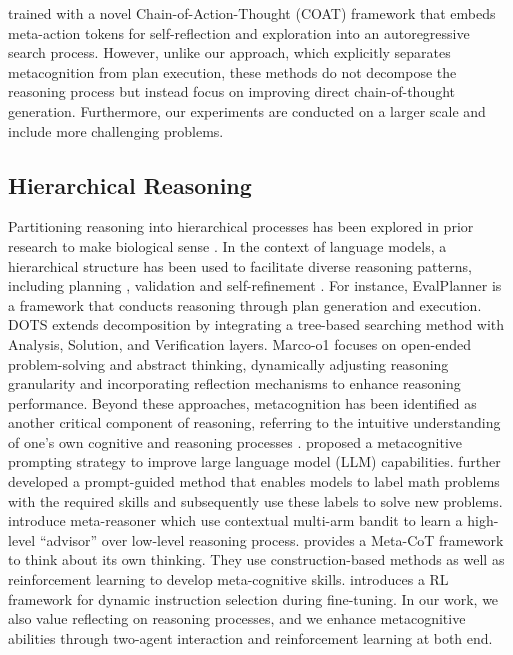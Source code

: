 \citet{shen2025satorireinforcementlearningchainofactionthought} trained with a novel Chain-of-Action-Thought (COAT) framework that embeds meta-action tokens for self-reflection and exploration into an autoregressive search process.
However, unlike our approach, which explicitly separates metacognition from plan execution, these methods do not decompose the reasoning process but instead focus on improving direct chain-of-thought generation. Furthermore, our experiments are conducted on a larger scale and include more challenging problems.

\subsection{Hierarchical Reasoning}\label{sec:ref3}
\label{related_work:hrl_reason}
Partitioning reasoning into hierarchical processes has been explored in prior research to make biological sense \citep{ye2018survey,langley2004hierarchical}. In the context of language models, a hierarchical structure has been used to facilitate diverse reasoning patterns, including planning \citep{puerta2025roadmap,sun2024retrieval,song2023llm,rana2023sayplan,chen2024autotamp,yan2023ask,xiao2024cellagent}, validation \citep{haji2024improvingllmreasoningmultiagent,xi2024enhancing} and self-refinement \citep{madaan2023self,kumar2024training,welleck2022generating}. For instance, EvalPlanner \citep{saha2025learningplanreason} is a framework that conducts reasoning through plan generation and execution. DOTS \citep{DBLP:journals/corr/abs-2410-03864} extends decomposition by integrating a tree-based searching method with Analysis, Solution, and Verification layers. Marco-o1 \citep{zhao2024marcoo1openreasoningmodels} focuses on open-ended problem-solving and abstract thinking, dynamically adjusting reasoning granularity and incorporating reflection mechanisms to enhance reasoning performance. Beyond these approaches, metacognition \citep{flavell1979metacognition} has been identified as another critical component of reasoning, referring to the intuitive understanding of one's own cognitive and reasoning processes \citep{gao2024meta,wang2023metacognitive}. \cite{wang2023metacognitive} proposed a metacognitive prompting strategy to improve large language model (LLM) capabilities. \cite{didolkar2024metacognitive} further developed a prompt-guided method that enables models to label math problems with the required skills and subsequently use these labels to solve new problems. \cite{gao2024meta} introduce meta-reasoner which use contextual multi-arm bandit to learn a high-level ``advisor'' over low-level reasoning process. \cite{xiang2025towards} provides a Meta-CoT framework to think about its own thinking. They use construction-based methods as well as reinforcement learning to develop meta-cognitive skills. 
\citet{qingsong2025raise} introduces a RL framework for dynamic instruction selection during fine-tuning.
In our work, we also value reflecting on reasoning processes, and we enhance metacognitive abilities through two-agent interaction and reinforcement learning at both end.

